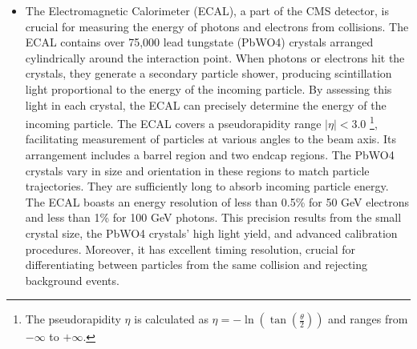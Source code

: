 \begin{itemize}
\item The Electromagnetic Calorimeter (ECAL), a part of the CMS detector, is crucial for measuring the energy of photons and electrons from collisions. The ECAL contains over 75,000 lead tungstate (PbWO4) crystals arranged cylindrically around the interaction point. When photons or electrons hit the crystals, they generate a secondary particle shower, producing scintillation light proportional to the energy of the incoming particle. By assessing this light in each crystal, the ECAL can precisely determine the energy of the incoming particle. The ECAL covers a pseudorapidity range $|\eta| < 3.0$ \footnote{The pseudorapidity $\eta$ is calculated as $\eta = - \ln(\tan(\frac{\theta}{2}))$ and ranges from $-\infty$ to $+\infty$.}, facilitating measurement of particles at various angles to the beam axis. Its arrangement includes a barrel region and two endcap regions. The PbWO4 crystals vary in size and orientation in these regions to match particle trajectories. They are sufficiently long to absorb incoming particle energy. The ECAL boasts an energy resolution of less than 0.5\% for 50 GeV electrons and less than 1\% for 100 GeV photons. This precision results from the small crystal size, the PbWO4 crystals' high light yield, and advanced calibration procedures. Moreover, it has excellent timing resolution, crucial for differentiating between particles from the same collision and rejecting background events.


\end{itemize}
